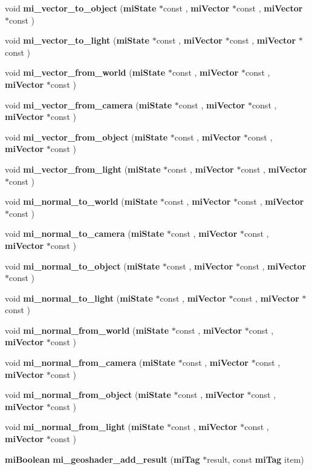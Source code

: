 \begin{CompactItemize}
void {\bf mi\_\-vector\_\-to\_\-object} ({\bf mi\-State} $\ast$const , {\bf mi\-Vector} $\ast$const , {\bf mi\-Vector} $\ast$const )
\item 
void {\bf mi\_\-vector\_\-to\_\-light} ({\bf mi\-State} $\ast$const , {\bf mi\-Vector} $\ast$const , {\bf mi\-Vector} $\ast$const )
\item 
void {\bf mi\_\-vector\_\-from\_\-world} ({\bf mi\-State} $\ast$const , {\bf mi\-Vector} $\ast$const , {\bf mi\-Vector} $\ast$const )
\item 
void {\bf mi\_\-vector\_\-from\_\-camera} ({\bf mi\-State} $\ast$const , {\bf mi\-Vector} $\ast$const , {\bf mi\-Vector} $\ast$const )
\item 
void {\bf mi\_\-vector\_\-from\_\-object} ({\bf mi\-State} $\ast$const , {\bf mi\-Vector} $\ast$const , {\bf mi\-Vector} $\ast$const )
\item 
void {\bf mi\_\-vector\_\-from\_\-light} ({\bf mi\-State} $\ast$const , {\bf mi\-Vector} $\ast$const , {\bf mi\-Vector} $\ast$const )
\item 
void {\bf mi\_\-normal\_\-to\_\-world} ({\bf mi\-State} $\ast$const , {\bf mi\-Vector} $\ast$const , {\bf mi\-Vector} $\ast$const )
\item 
void {\bf mi\_\-normal\_\-to\_\-camera} ({\bf mi\-State} $\ast$const , {\bf mi\-Vector} $\ast$const , {\bf mi\-Vector} $\ast$const )
\item 
void {\bf mi\_\-normal\_\-to\_\-object} ({\bf mi\-State} $\ast$const , {\bf mi\-Vector} $\ast$const , {\bf mi\-Vector} $\ast$const )
\item 
void {\bf mi\_\-normal\_\-to\_\-light} ({\bf mi\-State} $\ast$const , {\bf mi\-Vector} $\ast$const , {\bf mi\-Vector} $\ast$const )
\item 
void {\bf mi\_\-normal\_\-from\_\-world} ({\bf mi\-State} $\ast$const , {\bf mi\-Vector} $\ast$const , {\bf mi\-Vector} $\ast$const )
\item 
void {\bf mi\_\-normal\_\-from\_\-camera} ({\bf mi\-State} $\ast$const , {\bf mi\-Vector} $\ast$const , {\bf mi\-Vector} $\ast$const )
\item 
void {\bf mi\_\-normal\_\-from\_\-object} ({\bf mi\-State} $\ast$const , {\bf mi\-Vector} $\ast$const , {\bf mi\-Vector} $\ast$const )
\item 
void {\bf mi\_\-normal\_\-from\_\-light} ({\bf mi\-State} $\ast$const , {\bf mi\-Vector} $\ast$const , {\bf mi\-Vector} $\ast$const )
\item 
{\bf mi\-Boolean} {\bf mi\_\-geoshader\_\-add\_\-result} ({\bf mi\-Tag} $\ast$result, const {\bf mi\-Tag} item)

\end{CompactItemize}
